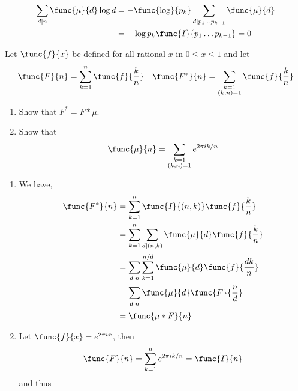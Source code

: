 \begin{exercise}
\begin{solution}
            \begin{align*}
                \sum_{d \mid n} \func{\mu}{d} \log d &=-  \func{\log}{p_k}  \sum_{d \mid p_1\dots p_{k-1}} \func{\mu}{d} \\
                &= - \log p_k \func{I}{p_1 \dots p_{k-1}}= 0
            \end{align*}
    \end{solution}
    \item Let \(\func{f}{x}\) be defined for all rational \(x\) in \(0 \leq x \leq 1\) and let 
    \begin{align*}
        \func{F}{n} &= \sum_{k = 1}^n \func{f}{\frac{k}{n}} & \func{F^{\ast}}{n} = \sum_{\substack{k = 1\\ (k,n) = 1}} \func{f}{\frac{k}{n}}
    \end{align*}
    \begin{enumerate}
        \item Show that \(F^{\ast} = F \ast \mu\).
        \item Show that 
        \begin{equation*}
            \func{\mu}{n} =\sum_{\substack{k = 1\\ (k,n) = 1}} e^{2\pi ik/n}
        \end{equation*}
    \end{enumerate}
    \begin{solution}
        \begin{enumerate}
            \item We have,
        \begin{align*}
            \func{F^{\ast}}{n} &= \sum_{k = 1}^n \func{I}{(n,k)} \func{f}{\frac{k}{n}}\\
            &= \sum_{k = 1}^n \sum_{d \mid (n,k)} \func{\mu}{d} \func{f}{\frac{k}{n}}\\
            &= \sum_{d \mid n} \sum_{k = 1}^{n/d} \func{\mu}{d} \func{f}{\frac{dk}{n}}\\
            &= \sum_{d \mid n} \func{\mu}{d} \func{F}{\frac{n}{d}}\\
            &= \func{\mu \ast F}{n}
        \end{align*}
            \item Let \(\func{f}{x} = e^{2 \pi i x}\), then 
            \begin{equation*}
                \func{F}{n} = \sum_{k = 1}^n e^{2 \pi i k/n} = \func{I}{n}
            \end{equation*}
            and thus 
            \begin{equation*}

\end{equation*}
\end{enumerate}
\end{solution}
\end{exercise}
